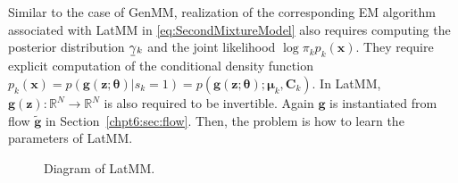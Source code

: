 Similar to the case of GenMM, realization of the corresponding EM
algorithm associated with LatMM in \eqref{eq:SecondMixtureModel}
also requires computing the posterior distribution $\ubar{\gamma}_k$ and the joint likelihood $\log{\pi_k p_k(\bm{x})}$. They require explicit computation of the conditional density function $p_k(\bm{x}) = p(\bm{g}(\bm{z};\bm{\theta})| s_k=1) = p(\bm{g}(\bm{z};\bm{\theta});\bm{\mu}_k, \bm{C}_k) $. In LatMM, $\bm{g}(\bm{z}): \mathbb{R}^N \rightarrow \mathbb{R}^N$ is also required to be invertible. Again $\bm{g}$ is instantiated from flow $\tilde{\bm{g}}$ in Section~\ref{chpt6:sec:flow}. Then, the problem is how to learn the parameters of LatMM.

\begin{figure}
  \centering
  \caption{Diagram of LatMM.}\label{dia-emgm-sm}
\end{figure}


